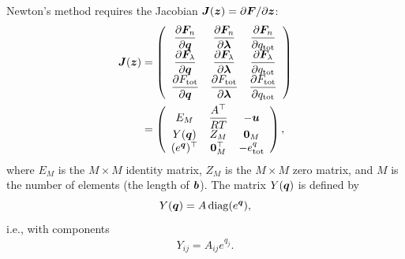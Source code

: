 Newton’s method requires the Jacobian $\boldsymbol{J} (\boldsymbol{z}) = \partial \boldsymbol{F} / \partial \boldsymbol{z}$:
\begin{align}
\label{eq:jacobian_tce}
\boldsymbol{J} (\boldsymbol{z}) &=
\left(
\begin{array}{ccc}
    \dfrac{\partial \boldsymbol{F}_n}{\partial \boldsymbol{q}}  & \dfrac{\partial \boldsymbol{F}_n}{\partial \boldsymbol{\lambda}}& \dfrac{\partial \boldsymbol{F}_n}{\partial q_\mathrm{tot}}\\ 
    \dfrac{\partial \boldsymbol{F}_\lambda}{\partial \boldsymbol{q}} & \dfrac{\partial \boldsymbol{F}_\lambda}{\partial \boldsymbol{\lambda}} & \dfrac{\partial \boldsymbol{F}_\lambda}{\partial q_\mathrm{tot}} \\
    \dfrac{\partial F_\mathrm{tot}}{\partial \boldsymbol{q}} & \dfrac{\partial F_\mathrm{tot}}{\partial \boldsymbol{\lambda}} & \dfrac{\partial F_\mathrm{tot}}{\partial q_\mathrm{tot}} \\  
\end{array}
\right) \nonumber \\
&=
\left(
\begin{array}{ccc}
 E_M &  \dfrac{A^\top}{RT} & - \boldsymbol{u}\\ 
 Y(\boldsymbol{q}) & Z_M & \boldsymbol{0}_M \\ 
 (e^{\boldsymbol{q}})^\top & \boldsymbol{0}_M^\top & - e^q_\mathrm{tot}\\  
\end{array}
\right),
\end{align}
where $E_M$ is the $M \times M$ identity matrix, $Z_M$ is the $M \times M$ zero matrix, and $M$ is the number of elements (the length of $\boldsymbol{b}$). The matrix $Y(\boldsymbol{q})$ is defined by
\[
Y(\boldsymbol{q})= A \, \mathrm{diag}(e^{\boldsymbol{q}}),
\]
i.e., with components
\begin{align}
Y_{ij} = A_{ij} e^{q_j}.
\end{align}

